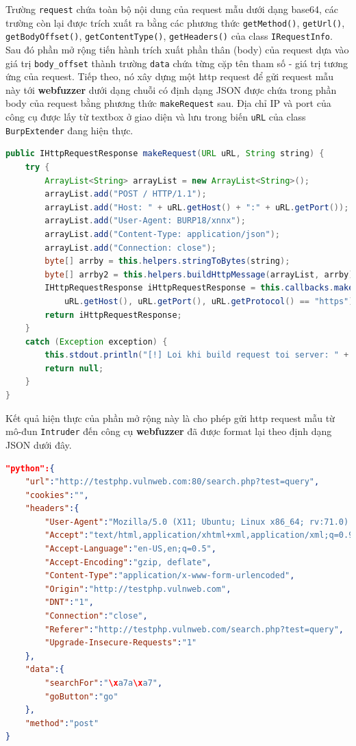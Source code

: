 Trường \texttt{request} chứa toàn bộ nội dung của request mẫu dưới dạng base64, các trường còn lại được trích xuất ra bằng các phương thức \texttt{getMethod()}, \texttt{getUrl()}, \texttt{getBodyOffset()}, \texttt{getContentType()}, \texttt{getHeaders()} của class \texttt{IRequestInfo}. Sau đó phần mở rộng tiến hành trích xuất phần thân (body) của request dựa vào giá trị \texttt{body\_offset} thành trường \texttt{data} chứa từng cặp tên tham số - giá trị tương ứng của request. Tiếp theo, nó xây dựng một \acrshort{http} request để gửi request mẫu này tới \textbf{webfuzzer} dưới dạng chuỗi có định dạng JSON được chứa trong phần body của request bằng phương thức \texttt{makeRequest} sau. Địa chỉ IP và port của công cụ được lấy từ textbox ở giao diện và lưu trong biến \texttt{uRL} của class \texttt{BurpExtender} đang hiện thực.\\
\begin{lstlisting}[language=Java]
public IHttpRequestResponse makeRequest(URL uRL, String string) {
    try {
        ArrayList<String> arrayList = new ArrayList<String>();
        arrayList.add("POST / HTTP/1.1");
        arrayList.add("Host: " + uRL.getHost() + ":" + uRL.getPort());
        arrayList.add("User-Agent: BURP18/xnnx");
        arrayList.add("Content-Type: application/json");
        arrayList.add("Connection: close");
        byte[] arrby = this.helpers.stringToBytes(string);
        byte[] arrby2 = this.helpers.buildHttpMessage(arrayList, arrby);
        IHttpRequestResponse iHttpRequestResponse = this.callbacks.makeHttpRequest(this.helpers.buildHttpService(
            uRL.getHost(), uRL.getPort(), uRL.getProtocol() == "https"), arrby2);
        return iHttpRequestResponse;
    }
    catch (Exception exception) {
        this.stdout.println("[!] Loi khi build request toi server: " + exception.getMessage());
        return null;
    }
}
\end{lstlisting}
Kết quả hiện thực của phần mở rộng này là cho phép gửi \acrshort{http} request mẫu từ mô-đun \texttt{Intruder} đến công cụ \textbf{webfuzzer} đã được format lại theo định dạng JSON dưới đây.\\
\begin{lstlisting}[language=json,firstnumber=1]
"python":{ 
    "url":"http://testphp.vulnweb.com:80/search.php?test=query",
    "cookies":"",
    "headers":{ 
        "User-Agent":"Mozilla/5.0 (X11; Ubuntu; Linux x86_64; rv:71.0) Gecko/20100101 Firefox/71.0",
        "Accept":"text/html,application/xhtml+xml,application/xml;q=0.9,*/*;q=0.8",
        "Accept-Language":"en-US,en;q=0.5",
        "Accept-Encoding":"gzip, deflate",
        "Content-Type":"application/x-www-form-urlencoded",
        "Origin":"http://testphp.vulnweb.com",
        "DNT":"1",
        "Connection":"close",
        "Referer":"http://testphp.vulnweb.com/search.php?test=query",
        "Upgrade-Insecure-Requests":"1"
    },
    "data":{ 
        "searchFor":"\xa7a\xa7",
        "goButton":"go"
    },
    "method":"post"
}
\end{lstlisting}
